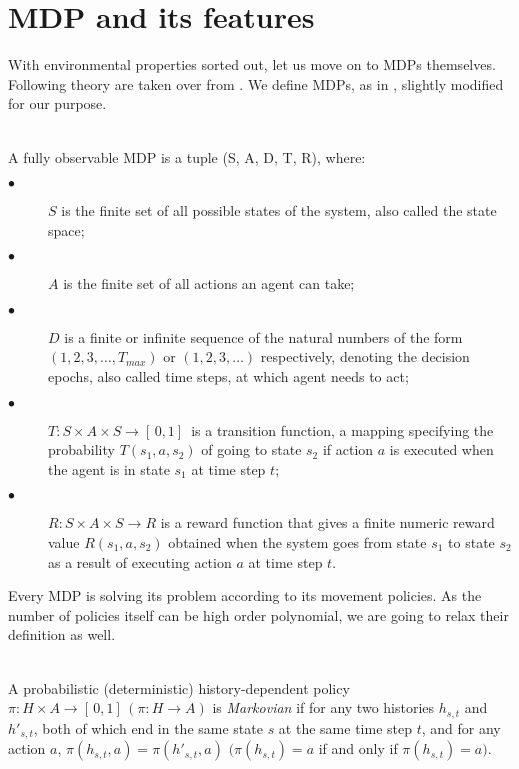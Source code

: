 \section{MDP and its features}
With environmental properties sorted out, let us move on to MDPs themselves. \\
Following theory are taken over from \cite{Kolobov2012}.
We define MDPs, as in \cite{Kolobov2012}, slightly modified for our purpose.
  \\ \\

\begin{definition}
A fully observable MDP is a tuple (S, A, D, T, R), where:
\begin{description}
  \item[$\bullet$ ] $S$ is the finite set of all possible states of the system, also called the state space;
  \item[$\bullet$ ] $A$ is the finite set of all actions an agent can take;
  \item[$\bullet$ ] $D$ is a finite or infinite sequence of the natural numbers of the form $(1, 2, 3, \ldots, T_{max})$ or $(1, 2, 3, \ldots)$ respectively, 
        denoting the decision epochs, also called time steps, at which agent needs to act;
  \item[$\bullet$ ] $T : S \times A \times S \rightarrow [ \,0, 1] \,$ is a transition function, a mapping specifying the probability $T(s_1, a, s_2)$ of going to state $s_2$ if action $a$ is executed when the agent is in state $s_1$ at time step $t$;
  \item[$\bullet$ ] $R : S \times A \times S \rightarrow R$ is a reward function that gives a finite numeric reward value $R(s_1, a, s_2)$ obtained when the system goes from state $s_1$ to state $s_2$ as a result of executing action $a$ at time step $t$.
\end{description}

\end{definition}

Every MDP is solving its problem according to its movement policies. As the number of policies itself can be high order polynomial, we are going to relax their definition as well.
\\ \\
\begin{definition}
A probabilistic (deterministic) history-dependent policy $\pi: H \times A \rightarrow [ \,0, 1] \,(\pi: H \rightarrow A)$ is \textit{Markovian} if for any two histories $h_{s,t}$ and $h'_{s,t}$, both of which end in the same state $s$ at the same time step $t$, and for any action $a$, 
$\pi(h_{s,t}, a) = \pi(h'_{s,t}, a)$ $(\pi(h_{s,t}) = a$ if and only if $\pi(h_{s,t}) = a)$.
\end{definition}

